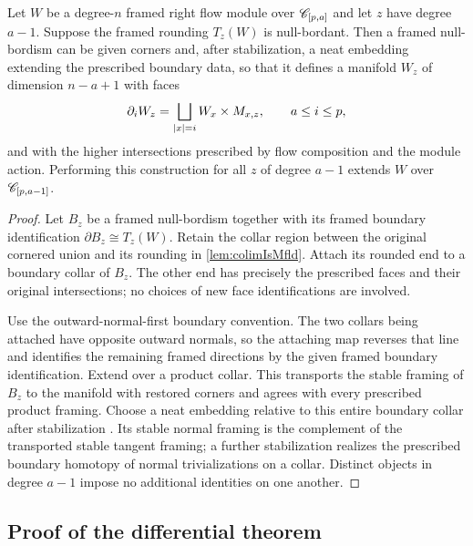 \begin{lem}\label{lem:flow_restore_corners}
    Let $W$ be a degree-$n$ framed right flow module over $\mathscr{C}_{[p,a]}$ and let $z$ have degree $a-1$. Suppose the framed rounding $T_z(W)$ is null-bordant. Then a framed null-bordism can be given corners and, after stabilization, a neat embedding extending the prescribed boundary data, so that it defines a manifold $W_z$ of dimension $n-a+1$ with faces
    \[
        \partial_i W_z
        =\bigsqcup_{\left\lvert x\right\rvert=i}W_x\times M_{x,z},
        \qquad a\leq i\leq p,
    \]
    and with the higher intersections prescribed by flow composition and the module action. Performing this construction for all $z$ of degree $a-1$ extends $W$ over $\mathscr{C}_{[p,a-1]}$.
\end{lem}
\begin{proof}
    Let $B_z$ be a framed null-bordism together with its framed boundary identification $\partial B_z\cong T_z(W)$. Retain the collar region between the original cornered union and its rounding in \cref{lem:colimIsMfld}. Attach its rounded end to a boundary collar of $B_z$. The other end has precisely the prescribed faces and their original intersections; no choices of new face identifications are involved.

    Use the outward-normal-first boundary convention. The two collars being attached have opposite outward normals, so the attaching map reverses that line and identifies the remaining framed directions by the given framed boundary identification. Extend over a product collar. This transports the stable framing of $B_z$ to the manifold with restored corners and agrees with every prescribed product framing. Choose a neat embedding relative to this entire boundary collar after stabilization \cite[Proposition~2.8]{Genauer12}. Its stable normal framing is the complement of the transported stable tangent framing; a further stabilization realizes the prescribed boundary homotopy of normal trivializations on a collar. Distinct objects in degree $a-1$ impose no additional identities on one another.
\end{proof}

\subsection{Proof of the differential theorem}

